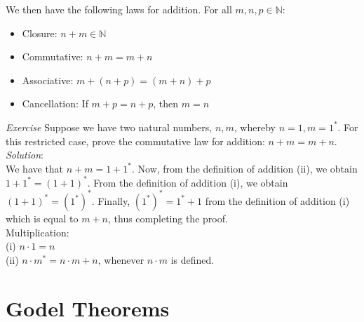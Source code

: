 We then have the following laws for addition.  For all $m,n,p \in \mathbb{N}$:\\
\begin{itemize}
\item Closure: $n+m \in \mathbb{N}$
\item Commutative: $n+m=m+n$
\item Associative: $m + ( n+p) =(m+n)+p$
\item Cancellation: If $m+p=n+p$, then $m=n$
\end{itemize}

\textit{Exercise} Suppose we have two natural numbers, $n,m$, whereby $n=1, m=1^{*}$.  For this restricted case, prove the commutative law for addition: $n+m=m+n$.\\
\textit{Solution}:\\
We have that $n+m=1+1^{*}$.  Now, from the definition of addition (ii), we obtain $1+1^{*}=(1+1)^{*}$.  From the definition of addition (i), we obtain $(1+1)^{*}=(1^{*})^{*}$.  Finally, $(1^{*})^{*}=1^{*}+1$ from the definition of addition (i) which is equal to $m+n$, thus completing the proof.\\

Multiplication:\\
(i) $n \cdot 1 = n$\\
(ii) $n \cdot m^{*}=n \cdot m + n$, whenever $n \cdot m$ is defined.\\


\section{Godel Theorems}